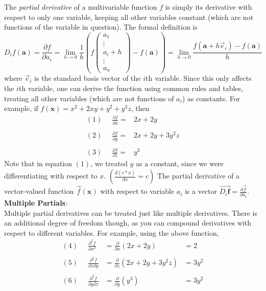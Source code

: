 \documentclass{article}
\begin{document}
The \emph{partial derivative} of a multivariable function $f$ is simply its derivative with respect to only one variable, keeping all other variables constant (which are not functions of the variable in question). The formal definition is
$$D_if(\mathbf{a})=\frac{\partial f}{\partial a_i} = \lim_{h\rightarrow 0}\frac{1}{h}\left(f\left(\begin{array}{c}a_1\\ \vdots\\a_i+h\\ \vdots\\a_n\end{array}\right) - f\left(\mathbf{a}\right)\right)
= \lim_{h\rightarrow 0}\frac{f(\mathbf{a}+h\vec{e}_i)-f(\mathbf{a})}{h}$$ where $\vec{e}_i$ is the standard basis vector of the $i$th variable. Since this only affects the $i$th variable, one can derive the function using common rules and tables, treating all other variables (which are not functions of $a_i$) as constants. For example, if $f(\mathbf{x})=x^2 + 2xy + y^2 + y^3z$, then\\
$$\begin{array}{lll}
(1)\;\; & \frac{\partial f}{\partial x} = & 2x + 2y\\
&&\\
(2)\;\; & \frac{\partial f}{\partial y} = & 2x + 2y + 3y^2z\\
&&\\
(3)\;\; & \frac{\partial f}{\partial z} = & y^3
\end{array}$$
Note that in equation $(1)$, we treated $y$ as a constant, since we were differentiating with respect to $x$. $\left(\frac{d(c*x)}{dx} = c\right)$ The partial derivative of a vector-valued function $\vec{f}(\mathbf{x})$ with respect to variable $a_i$ is a vector $\overrightarrow{D_i\mathbf{f}}=\frac{\partial\vec{f}}{\partial a_i}$.\\
\textbf{Multiple Partials}:\\
Multiple partial derivatives can be treated just like multiple derivatives. There is an additional degree of freedom though, as you can compound derivatives with respect to different variables. For example, using the above function,
$$\begin{array}{llll}
(4)\;\; & \frac{\partial^2 f}{\partial x^2} & = \frac{\partial}{\partial x}(2x + 2y) & = 2\\
&&&\\
(5)\;\; & \frac{\partial^2 f}{\partial z \partial y} & = \frac{\partial}{\partial z}(2x + 2y + 3y^2z) & = 3y^2\\
&&&\\
(6)\;\; & \frac{\partial^2 f}{\partial y \partial z} & = \frac{\partial}{\partial y}(y^3) & = 3y^2
\end{array}$$
\end{document}

